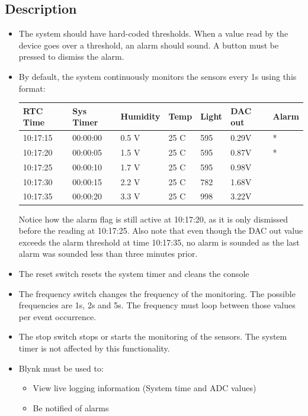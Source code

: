 \subsection{Description}
\label{sec:ProjDescription}
\begin{itemize}
    \item The system should have hard-coded thresholds. When a value read by the device goes over a threshold, an alarm should sound. A button must be pressed to dismiss the alarm.
    \item By default, the system continuously monitors the sensors every 1s using this format:
    \begin{table}[H]
    \centering
    \begin{tabular}{|l|l|l|l|l|l|l|}
    \hline
    RTC Time & Sys Timer & Humidity  & Temp  & Light & DAC out & Alarm \\ \hline
    10:17:15 & 00:00:00 & 0.5 V &   25 C    & 595 & 0.29V&* \\ \hline
    10:17:20 & 00:00:05 & 1.5 V &   25 C    & 595 & 0.87V&* \\ \hline
    10:17:25 & 00:00:10 & 1.7 V &   25 C    & 595 & 0.98V&  \\ \hline
    10:17:30 & 00:00:15 & 2.2 V &   25 C    & 782 & 1.68V&  \\ \hline
    10:17:35 & 00:00:20 & 3.3 V &   25 C    & 998 & 3.22V&  \\ \hline
    \end{tabular}
    \end{table}
    Notice how the alarm flag is still active at 10:17:20, as it is only dismissed before the reading at 10:17:25. Also note that even though the DAC out value exceeds the alarm threshold at time 10:17:35, no alarm is sounded as the last alarm was sounded less than three minutes prior. 
    \item The reset switch resets the system timer and cleans the console
    \item The frequency switch changes the frequency of the monitoring. The possible frequencies are 1s, 2s and 5s. The frequency must loop between those values per event occurrence.
    \item The stop switch stops or starts the monitoring of the sensors. The system timer is not affected by this functionality.
    \item Blynk must be used to:
    \begin{itemize}
        \item View live logging information (System time and ADC values)
        \item Be notified of alarms
    \end{itemize}
\end{itemize}


